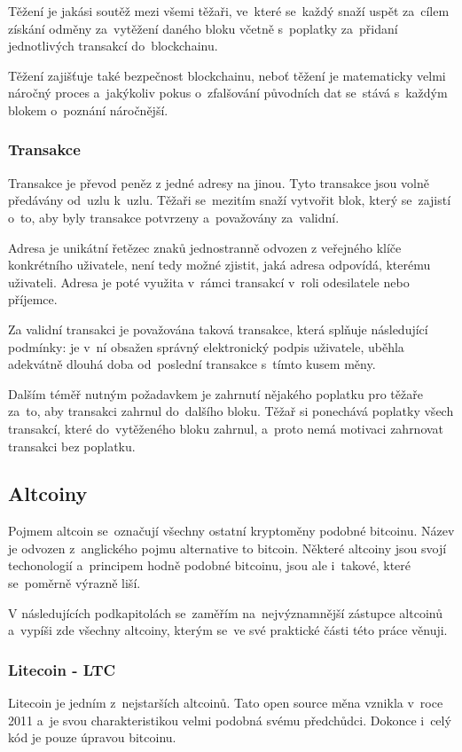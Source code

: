 \documentclass[thesis=B,czech]{FITthesis}[2019/03/21]
\begin{document}
Těžení je jakási soutěž mezi všemi těžaři, ve~které se~každý snaží uspět za~cílem získání odměny za~vytěžení daného bloku včetně s~poplatky za~přidaní jednotlivých transakcí do~blockchainu.

Těžení zajišťuje také bezpečnost blockchainu, neboť těžení je matematicky velmi náročný proces a~jakýkoliv pokus o~zfalšování původních dat se~stává s~každým blokem o~poznání náročnější. \cite{mastering_bitcoin}

\subsubsection{Transakce}
Transakce je převod peněz z jedné adresy na jinou. Tyto transakce jsou volně předávány od~uzlu k~uzlu. Těžaři se~mezitím snaží vytvořit blok, který se~zajistí o~to, aby byly transakce potvrzeny a~považovány za~validní.

Adresa je unikátní řetězec znaků jednostranně odvozen z veřejného klíče konkrétního uživatele, není tedy možné zjistit, jaká adresa odpovídá, kterému uživateli. Adresa je poté využita v~rámci transakcí v~roli odesilatele nebo příjemce. \cite{mastering_bitcoin}

Za validní transakci je považována taková transakce, která splňuje \linebreak následující podmínky: je v~ní obsažen správný elektronický podpis uživatele, uběhla adekvátně dlouhá doba od~poslední transakce s~tímto kusem měny. \cite{Finex_blockchain}

Dalším téměř nutným požadavkem je zahrnutí nějakého poplatku pro těžaře za~to, aby transakci zahrnul do~dalšího bloku. Těžař si ponechává poplatky všech transakcí, které do~vytěženého bloku zahrnul, a~proto nemá motivaci zahrnovat transakci bez poplatku. \cite{Finex_blockchain}

\subsection{Altcoiny}
Pojmem altcoin se~označují všechny ostatní kryptoměny podobné bitcoinu. Název je odvozen z~anglického pojmu alternative to bitcoin. Některé altcoiny jsou svojí techonologií a~principem hodně podobné bitcoinu, jsou ale i~takové, které se~poměrně výrazně liší. \cite{pecev}

V následujících podkapitolách se~zaměřím na~nejvýznamnější zástupce altcoinů a~vypíši zde všechny altcoiny, kterým se~ve své praktické části této práce věnuji.

\subsubsection{Litecoin - LTC}
Litecoin je jedním z~nejstarších altcoinů. Tato open source měna vznikla v~roce 2011 a~je svou charakteristikou velmi podobná svému předchůdci. \cite{litecoin} Dokonce i~celý kód je pouze úpravou bitcoinu. \cite{alza_monero}
\end{document}
